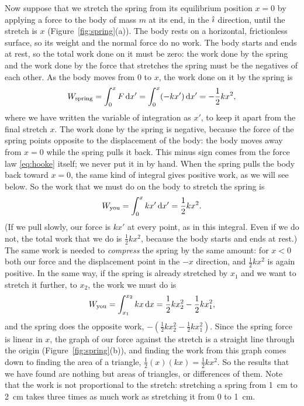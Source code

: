 \documentclass[11pt,a4paper]{article}
\begin{document}
Now suppose that we stretch the spring from its equilibrium position $x = 0$ by applying a force to
the body of mass $m$ at its end, in the $\hat{\imath}$ direction, until the stretch is $x$
(Figure~\ref{fig:spring}(a)). The body rests on a horizontal, frictionless surface, so its weight and
the normal force do no work. The body starts and ends at rest, so the total work done on it must be
zero: the work done by the spring and the work done by the force that stretches the spring must be the
negatives of each other. As the body moves from $0$ to $x$, the work done on it by the spring is
\begin{equation}\label{eq:W-spring}
  W_{\mathrm{spring}} = \int_0^x F\,\mathrm{d} x' = \int_0^x (-kx')\,\mathrm{d} x' = -\frac12 kx^2 ,
\end{equation}
where we have written the variable of integration as $x'$, to keep it apart from the final stretch
$x$. The work done by the spring is negative, because the force of the spring points opposite to the
displacement of the body: the body moves away from $x = 0$ while the spring pulls it back. This minus
sign comes from the force law \eqref{eq:hooke} itself; we never put it in by hand. When the spring
pulls the body back toward $x = 0$, the same kind of integral gives positive work, as we will see
below. So the work that we must do on the body to stretch the spring is
\begin{equation}\label{eq:W-stretch}
  W_{\mathrm{you}} = \int_0^x kx'\,\mathrm{d} x' = \frac12 kx^2 .
\end{equation}
(If we pull slowly, our force is $kx'$ at every point, as in this integral. Even if we do not, the
total work that we do is $\frac12 kx^2$, because the body starts and ends at rest.) The same work is
needed to \emph{compress} the spring by the same amount: for $x < 0$ both our force and the
displacement point in the $-x$ direction, and $\frac12 kx^2$ is again positive. In the same way, if
the spring is already stretched by $x_1$ and we want to stretch it further, to $x_2$, the work we must
do is
\begin{equation}\label{eq:W-x1x2}
  W_{\mathrm{you}} = \int_{x_1}^{x_2} kx\,\mathrm{d} x = \frac12 kx_2^2 - \frac12 kx_1^2 ,
\end{equation}
and the spring does the opposite work, $-(\frac12 kx_2^2 - \frac12 kx_1^2)$. Since the spring force is
linear in $x$, the graph of our force against the stretch is a straight line through the origin
(Figure~\ref{fig:spring}(b)), and finding the work from this graph comes down to finding the area of a
triangle, $\frac12(x)(kx) = \frac12 kx^2$. So the results that we have found are nothing but areas of
triangles, or differences of them. Note that the work is not proportional to the stretch: stretching
a spring from \qty{1}{cm} to \qty{2}{cm} takes three times as much work as stretching it from $0$ to
\qty{1}{cm}.
\end{document}
